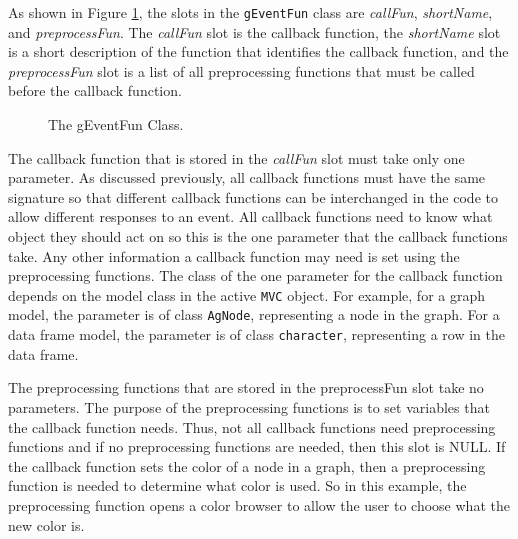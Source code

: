\documentclass{article}[11pt]
\newcommand{\Robject}[1]{{\texttt{#1}}}
\newcommand{\Rslot}[1]{\textsl{#1}}
\newcommand{\Rclass}[1]{\texttt{#1}}
\begin{document}
As shown in Figure \ref{Fig:EventFun}, the slots in the \Rclass{gEventFun}
class are \Rslot{callFun}, \Rslot{shortName}, and \Rslot{preprocessFun}.  The
\Rslot{callFun} slot is the callback function, the
\Rslot{shortName} slot is a short description of the function that
identifies the callback function, and the
\Rslot{preprocessFun} slot is a list of all preprocessing
functions that must be called before the callback function.

\begin{figure}[ht]
  \begin{center}
    \caption{ The gEventFun Class. }
    \label{Fig:EventFun}
  \end{center}
\end{figure}

The callback function that is stored in the \Rslot{callFun} slot must take
only one parameter.  As discussed previously, all callback functions must have
the same signature so that different callback functions can be interchanged in
the code to allow different responses to an event.  All callback functions
need to know what object they should act on so this is the one
parameter that the callback functions take.  Any other information a callback
function may need is set using the preprocessing functions.  The class of
the one parameter for the callback function depends on the model class in
the active \Robject{MVC} object.  For example, for a graph model, the
parameter is of class \Rclass{AgNode}, representing a node in the graph.  For
a data frame model, the parameter is of class \Rclass{character}, representing
a row in the data frame. 

The preprocessing functions that are stored in the preprocessFun slot
take no parameters.  The purpose of the preprocessing functions is to set
variables that the callback function needs.  Thus, not all callback
functions need preprocessing functions and if no preprocessing functions
are needed, then this slot is NULL.  If the callback function sets the
color of a node in a graph, then a preprocessing function is needed to
determine what color is used.  So in this example, the preprocessing
function opens a color browser to allow the user to choose what the new
color is.
\end{document}
